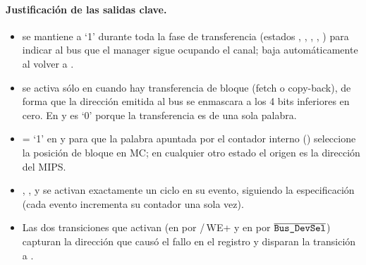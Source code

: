 \paragraph{Justificaci\'on de las salidas clave.}
\begin{itemize}[leftmargin=1.2em]
  \item {} se mantiene a `1' durante toda la fase de transferencia (estados
    , , , ,
    ) para indicar al bus que el manager sigue ocupando el canal; baja
    autom\'aticamente al volver a .
  \item {} se activa s\'olo en  cuando hay transferencia de
    bloque (fetch o copy-back), de forma que la direcci\'on emitida al bus se enmascara a
    los 4 bits inferiores en cero. En  y  es `0'
    porque la transferencia es de una sola palabra.
  \item {} = `1' en  y  para que la
    palabra apuntada por el contador interno () seleccione la posici\'on
    de bloque en MC; en cualquier otro estado el origen es la direcci\'on del MIPS.
  \item {}, ,  y  se activan exactamente
    un ciclo en su evento, siguiendo la especificaci\'on (cada evento incrementa su
    contador una sola vez).
  \item Las dos transiciones que activan  (en 
    por /\,WE+ y en  por
    $\overline{\texttt{Bus\_DevSel}}$) capturan la direcci\'on que caus\'o el fallo en el
    registro  y disparan la transici\'on a .
\end{itemize}
